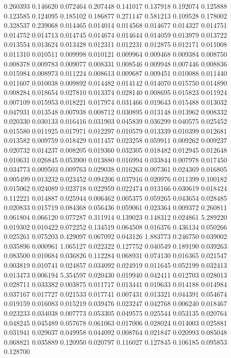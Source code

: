 0.260393
0.146620
0.072464
0.207448
0.141017
0.137918
0.192074
0.125888
0.123585
0.124095
0.185102
0.186877
0.271147
0.581213
0.109528
0.178002
0.328537
0.239068
0.014465
0.014014
0.014568
0.014677
0.014327
0.014751
0.014752
0.014713
0.014745
0.014674
0.014644
0.014059
0.013979
0.013722
0.013554
0.013624
0.013428
0.012311
0.012231
0.012875
0.012171
0.011008
0.011310
0.010511
0.009998
0.010121
0.009964
0.009468
0.009384
0.008750
0.008378
0.009783
0.009077
0.008331
0.008546
0.009948
0.007446
0.008836
0.015984
0.008973
0.011224
0.008613
0.009687
0.009451
0.010088
0.011440
0.011607
0.010038
0.009892
0.014482
0.014142
0.014070
0.015750
0.014890
0.008284
0.018654
0.027810
0.013374
0.028140
0.008695
0.015823
0.011924
0.007109
0.015953
0.018221
0.017974
0.031466
0.019643
0.015488
0.013032
0.047931
0.013548
0.007938
0.008712
0.030895
0.013148
0.013962
0.008332
0.020330
0.030133
0.016416
0.031903
0.045839
0.036299
0.040575
0.025452
0.015580
0.011925
0.017971
0.012297
0.010579
0.013339
0.010399
0.012681
0.013582
0.009759
0.018429
0.011457
0.023258
0.059911
0.009262
0.009237
0.020732
0.014237
0.008205
0.019360
0.032305
0.018482
0.012945
0.012648
0.010631
0.026845
0.053900
0.013880
0.016994
0.033844
0.007978
0.017450
0.034773
0.009503
0.009763
0.029038
0.016263
0.007361
0.024369
0.016805
0.005499
0.013232
0.023452
0.094206
0.037916
0.020976
0.011399
0.100182
0.015062
0.024089
0.023718
0.022959
0.022474
0.013166
0.030619
0.018424
0.112221
0.014887
0.025944
0.006462
0.005375
0.059265
0.043654
0.028485
0.020833
0.015719
0.084368
0.056436
0.059061
0.023364
0.009372
0.260811
0.061804
0.066120
0.077287
0.311914
0.139023
0.148312
0.024861
5.289220
0.019302
0.010422
0.072252
0.134519
0.064508
0.016376
0.436134
0.050266
0.025261
0.075203
0.429097
0.067092
0.043126
1.883773
0.246750
0.039002
0.035896
0.000961
1.065127
0.022322
0.127752
0.040549
0.189190
0.039263
0.083500
0.010684
0.036826
0.112284
0.068931
0.074130
0.016365
0.021547
0.003819
0.010741
0.024857
0.034092
0.024919
0.011645
0.052199
0.032413
0.013473
0.006194
5.354597
0.020430
0.019940
0.042411
0.012703
0.028013
0.028711
0.033382
0.003875
0.011717
0.013441
0.019633
0.014188
0.014984
0.037167
0.017727
0.021533
0.017741
0.007431
0.013321
0.044391
0.054674
0.019159
0.016083
0.015219
0.039476
0.023247
0.042768
0.006240
0.018467
0.023233
0.034038
0.007773
0.053305
0.049575
0.025544
0.053135
0.020764
0.048245
0.045489
0.057678
0.061063
0.017006
0.028024
0.014003
0.025881
0.031941
0.029037
0.049958
0.044092
0.008764
0.021847
0.020993
0.085048
0.068821
0.035889
0.120950
0.020797
0.116027
0.127845
0.106185
0.095853
0.128700

